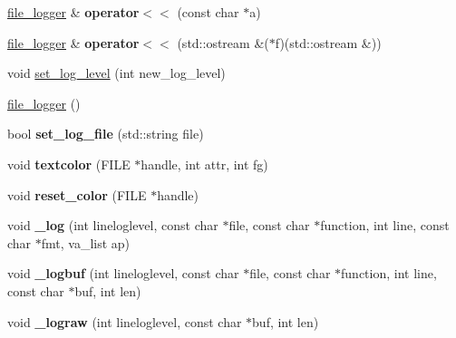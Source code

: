 \begin{DoxyCompactItemize}
\item 
\hypertarget{classfile__logger_a74af3648c42696b41fcc1f62d6bba3fa}{\hyperlink{classfile__logger}{file\-\_\-logger} \& {\bfseries operator$<$$<$} (const char $\ast$a)}\label{classfile__logger_a74af3648c42696b41fcc1f62d6bba3fa}

\item 
\hypertarget{classfile__logger_ad3753bbbe5e96733b7cf552442337ecc}{\hyperlink{classfile__logger}{file\-\_\-logger} \& {\bfseries operator$<$$<$} (std\-::ostream \&($\ast$f)(std\-::ostream \&))}\label{classfile__logger_ad3753bbbe5e96733b7cf552442337ecc}

\item 
void \hyperlink{classfile__logger_a21330e11d0d392e86d8d928e9408a4f1}{set\-\_\-log\-\_\-level} (int new\-\_\-log\-\_\-level)
\item 
\hyperlink{classfile__logger_a97b486960a56b3ca3bc657cfa9645cc9}{file\-\_\-logger} ()
\item 
\hypertarget{classfile__logger_abe325ad2b332c007e73053f111ff001b}{bool {\bfseries set\-\_\-log\-\_\-file} (std\-::string file)}\label{classfile__logger_abe325ad2b332c007e73053f111ff001b}

\item 
\hypertarget{classfile__logger_a6856b30bc36281bac53a3fef8b9baccc}{void {\bfseries textcolor} (F\-I\-L\-E $\ast$handle, int attr, int fg)}\label{classfile__logger_a6856b30bc36281bac53a3fef8b9baccc}

\item 
\hypertarget{classfile__logger_a8af1687ded9a0c178be3ec9b88d59e48}{void {\bfseries reset\-\_\-color} (F\-I\-L\-E $\ast$handle)}\label{classfile__logger_a8af1687ded9a0c178be3ec9b88d59e48}

\item 
\hypertarget{classfile__logger_a7de028f6b436a6bc0ae84df2d6aa9de7}{void {\bfseries \-\_\-log} (int lineloglevel, const char $\ast$file, const char $\ast$function, int line, const char $\ast$fmt, va\-\_\-list ap)}\label{classfile__logger_a7de028f6b436a6bc0ae84df2d6aa9de7}

\item 
\hypertarget{classfile__logger_ae811969922f3ba1010309bcea33e6866}{void {\bfseries \-\_\-logbuf} (int lineloglevel, const char $\ast$file, const char $\ast$function, int line, const char $\ast$buf, int len)}\label{classfile__logger_ae811969922f3ba1010309bcea33e6866}

\item 
\hypertarget{classfile__logger_ae6b57d652cdaf6c137533e5bac57b835}{void {\bfseries \-\_\-lograw} (int lineloglevel, const char $\ast$buf, int len)}\label{classfile__logger_ae6b57d652cdaf6c137533e5bac57b835}


\end{DoxyCompactItemize}
